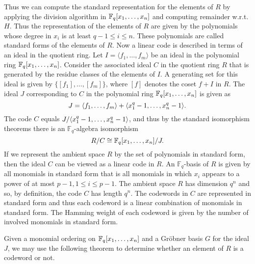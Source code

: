 \documentclass[english,bachelor]{liumaiex}
\begin{document}
Thus we can compute the standard representation for the elements of $R$ by applying the division algorithm in $\mathbb{F}_q[x_1,\dots,x_n]$ and computing remainder w.r.t. $H$. Thus the representation of the elements of $R$ are given by the polynomials whose degree in $x_i$ is at least $q-1\leq i\leq n$. These polynomials are called standard forms of the elements of $R$. Now a linear code is described in terms of an ideal in the quotient ring. Let $I=\langle f_1,\dots,f_m\rangle$ be an ideal in the polynomial ring $\mathbb{F}_q[x_1,\dots,x_n]$. Consider the associated ideal $C$ in the quotient ring $R$ that is generated by the residue classes of the elements of $I$. A generating set for this ideal is given by $\{[f_1],\dots,[f_m]\}$, where $[f]$ denotes the coset $f+I$ in $R$. The ideal $J$ corresponding to $C$ in the polynomial ring $\mathbb{F}_q[x_1,\dots,x_n]$ is given as
\begin{displaymath}
J=\langle f_1,\dots,f_m\rangle +\langle x_1^q-1,\dots,x_n^q-1\rangle.
\end{displaymath}
The code $C$ equals $J/\langle x_1^q-1,\dots,x_n^q-1\rangle$, and thus by the standard isomorphism theorems there is an $\mathbb{F}_q$-algebra isomorphism
\begin{displaymath}
R/C\cong\mathbb{F}_q[x_1,\dots,x_n]/J.
\end{displaymath}
If we represent the ambient space $R$ by the set of polynomials in standard form, then the ideal $C$ can be viewed as a linear code in $R$. An $\mathbb{F}_q$-basis of $R$ is given by all monomials in standard form that is all monomials in which $x_i$ appears to a power of at most $p-1, 1\leq i\leq p-1$. The ambient space $R$ has dimension $q^n$ and so, by definition, the code $C$ has length $q^n$. The codewords in $C$ are represented in standard form and thus each codeword is a linear combination of monomials in standard form. The Hamming weight of each codeword is given by the number of involved monomials in standard form.

Given a monomial ordering on $\mathbb{F}_q[x_1,\dots,x_n]$ and a Gröbner basis $G$ for the ideal $J$, we may use the following theorem to determine whether an element of $R$ is a codeword or not.
\end{document}

